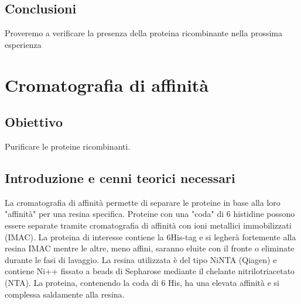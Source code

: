 \documentclass{extarticle}
\begin{document}
\subsection*{Conclusioni}
Proveremo a verificare la presenza della proteina ricombinante nella prossima esperienza

\newpage
\section{Cromatografia di affinità}
\subsection*{Obiettivo}
Purificare le proteine ricombinanti.
\subsection*{Introduzione e cenni teorici necessari}
La cromatografia di affinità permette di separare le proteine in base alla loro "affinità" per una resina specifica. Proteine con una "coda" di 6 histidine possono essere separate tramite cromatografia di affinità con ioni metallici immobilizzati (IMAC). La proteina di interesse contiene la 6His-tag e si legherà fortemente alla resina IMAC mentre le altre, meno affini, saranno eluite con il fronte o eliminate durante le fasi di lavaggio. La resina utilizzata è del tipo NiNTA (Qiagen) e contiene Ni++ fissato a beads di Sepharose mediante il chelante nitrilotriacetato (NTA). La proteina, contenendo la coda di 6 His, ha una elevata affinità e si complessa saldamente alla resina.
\end{document}
